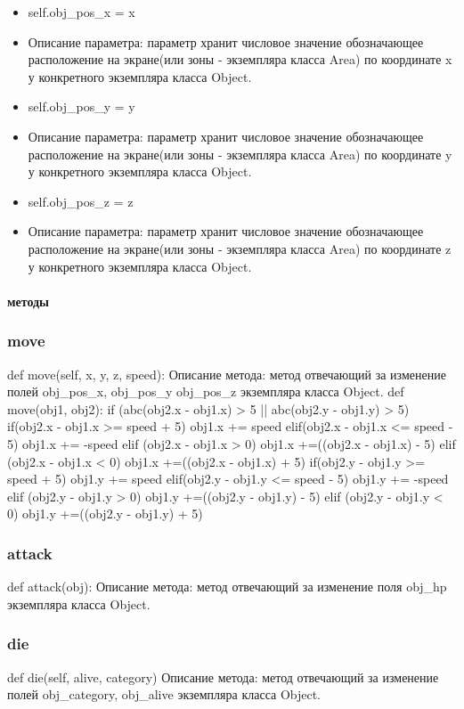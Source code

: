 \begin{itemize}
	\item self.obj\_pos\_x = x 
	\item Описание параметра: параметр хранит числовое значение обозначающее расположение на экране(или зоны - экземпляра класса Area) по координате x у конкретного экземпляра класса Object.
	\item self.obj\_pos\_y = y  
	\item Описание параметра: параметр хранит числовое значение обозначающее расположение на экране(или зоны - экземпляра класса Area) по координате y у конкретного экземпляра класса Object.
	\item self.obj\_pos\_z = z 
	\item Описание параметра: параметр хранит числовое значение обозначающее расположение на экране(или зоны - экземпляра класса Area) по координате z у конкретного экземпляра класса Object.
\end{itemize}
\paragraph{методы}
\subsubsection{move}

def move(self, x, y, z, speed):
Описание метода: метод отвечающий за изменение полей obj\_pos\_x, obj\_pos\_y obj\_pos\_z экземпляра класса Object.
def move(obj1, obj2):
	if (abc(obj2.x - obj1.x) > 5 || abc(obj2.y - obj1.y) > 5)
		if(obj2.x - obj1.x >= speed + 5)
			obj1.x += speed
		elif(obj2.x - obj1.x <= speed - 5)
			obj1.x += -speed
		elif (obj2.x - obj1.x > 0)
			obj1.x +=((obj2.x - obj1.x) - 5)
		elif (obj2.x - obj1.x < 0)
			obj1.x +=((obj2.x - obj1.x) + 5)
		if(obj2.y - obj1.y >= speed + 5)
			obj1.y += speed
		elif(obj2.y - obj1.y <= speed - 5)
			obj1.y += -speed
		elif (obj2.y - obj1.y > 0)
			obj1.y +=((obj2.y - obj1.y) - 5)
		elif (obj2.y - obj1.y < 0)
			obj1.y +=((obj2.y - obj1.y) + 5)
\subsubsection{attack}
 def attack(obj):
Описание метода: метод отвечающий за изменение поля obj\_hp экземпляра класса Object.
\subsubsection{die}
def die(self, alive, category)
Описание метода: метод отвечающий за изменение полей obj\_category, obj\_alive экземпляра класса Object.
